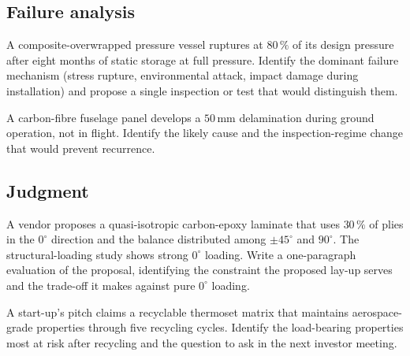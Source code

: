 \subsection*{Failure analysis}

\begin{exercise}
A composite-overwrapped pressure vessel ruptures at $80\,\%$ of its
design pressure after eight months of static storage at full pressure.
Identify the dominant failure mechanism (stress rupture, environmental
attack, impact damage during installation) and propose a single
inspection or test that would distinguish them.
\end{exercise}

\begin{exercise}
A carbon-fibre fuselage panel develops a $50\,\text{mm}$ delamination
during ground operation, not in flight. Identify the likely cause and
the inspection-regime change that would prevent recurrence.
\end{exercise}

\subsection*{Judgment}

\begin{exercise}
A vendor proposes a quasi-isotropic carbon-epoxy laminate that uses
$30\,\%$ of plies in the $0^\circ$ direction and the balance distributed
among $\pm 45^\circ$ and $90^\circ$. The structural-loading study shows
strong $0^\circ$ loading. Write a one-paragraph evaluation of the
proposal, identifying the constraint the proposed lay-up serves and
the trade-off it makes against pure $0^\circ$ loading.
\end{exercise}

\begin{exercise}
A start-up's pitch claims a recyclable thermoset matrix that
maintains aerospace-grade properties through five recycling cycles.
Identify the load-bearing properties most at risk after recycling and
the question to ask in the next investor meeting.
\end{exercise}
